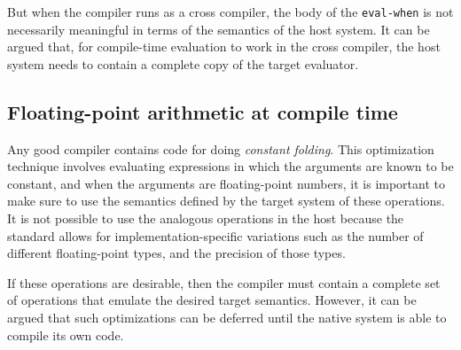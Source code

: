 But when the compiler runs as a cross compiler, the body of the
\texttt{eval-when} is not necessarily meaningful in terms of the
semantics of the host \commonlisp{} system.  It can be argued that,
for compile-time evaluation to work in the cross compiler, the host
system needs to contain a complete copy of the target evaluator.

\subsection{Floating-point arithmetic at compile time}

Any good compiler contains code for doing \emph{constant folding}.
This optimization technique involves evaluating expressions in which
the arguments are known to be constant, and when the arguments are
floating-point numbers, it is important to make sure to use the
semantics defined by the target \commonlisp{} system of these
operations.  It is not possible to use the analogous operations in the
host because the \commonlisp{} standard allows for
implementation-specific variations such as the number of different
floating-point types, and the precision of those types.

If these operations are desirable, then the compiler must contain a
complete set of operations that emulate the desired target semantics.
However, it can be argued that such optimizations can be deferred
until the native system is able to compile its own code.
